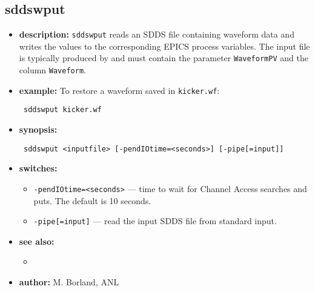 \begin{latexonly}
\newpage
\end{latexonly}

\subsection{sddswput}
\label{sddswput}

\begin{itemize}
\item {\bf description:}
  \verb+sddswput+ reads an SDDS file containing waveform data and writes the
  values to the corresponding EPICS process variables.  The input file is
  typically produced by  and must contain the parameter
  \verb|WaveformPV| and the column \verb|Waveform|.

\item {\bf example:}
  To restore a waveform saved in \verb|kicker.wf|:
  \begin{flushleft}{\tt
  sddswput kicker.wf
  }\end{flushleft}

\item {\bf synopsis:}
  \begin{flushleft}{\tt
  sddswput <inputfile>\
      [-pendIOtime=<seconds>] [-pipe[=input]]
  }\end{flushleft}

\item {\bf switches:}
  \begin{itemize}
  \item {\tt -pendIOtime=<seconds>} --- time to wait for Channel Access searches and puts. The default is 10 seconds.
  \item {\tt -pipe[=input]} --- read the input SDDS file from standard input.
  \end{itemize}

\item {\bf see also:}
  \begin{itemize}
  \item {}
  \end{itemize}

\item {\bf author:} M. Borland, ANL
\end{itemize}
